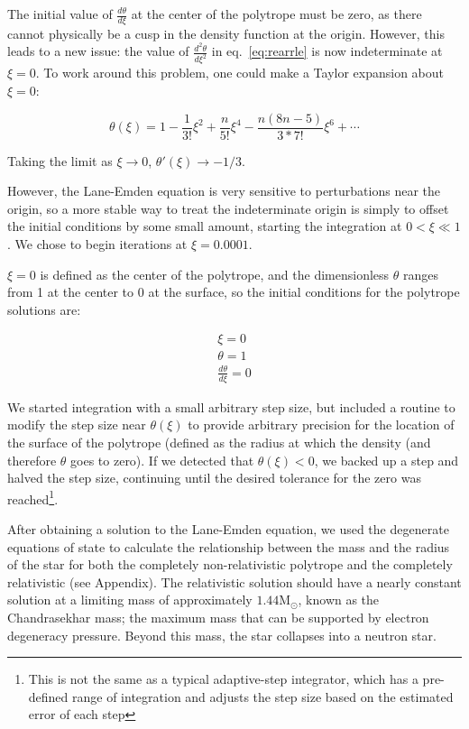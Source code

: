 \documentclass[twoside]{article}
\begin{document}
\begin{multicols}{2}
The initial value of \(\frac{d\theta}{d\xi}\) at the center of the polytrope
must be zero, as there cannot physically be a cusp in the density function at
the origin. However, this leads to a new issue: the value of
\(\frac{d^2\theta}{d\xi^2}\) in eq.~\ref{eq:rearrle} is now indeterminate at
\(\xi=0\). To work around this problem, one could make a Taylor expansion about
\(\xi=0\)\cite[p.339]{hansen2004}:

\begin{equation}
    \theta(\xi)=1-\frac{1}{3!}\xi^2+\frac{n}{5!}\xi^4-\frac{n(8n-5)}{3*7!}\xi^6+\dotsb
\end{equation}

Taking the limit as \(\xi\rightarrow 0\), \(\theta'(\xi)\rightarrow -1/3\).

However, the Lane-Emden equation is very sensitive to perturbations near the
origin\cite[p.340]{hansen2004}, so a more stable way to treat the indeterminate
origin is simply to offset the initial conditions by some small amount, starting
the integration at \(0 < \xi \ll 1\). We chose to begin iterations at
\(\xi=0.0001\).

\(\xi=0\) is defined as the center of the polytrope, and the dimensionless
\(\theta\) ranges from 1 at the center to 0 at the surface, so the initial
conditions for the polytrope solutions are:

\[
    \begin{array}{l}
        \xi = 0 \\
        \theta = 1 \\
        \frac{d\theta}{d\xi} = 0
    \end{array}
\]

We started integration with a small arbitrary step size, but included a routine
to modify the step size near \(\theta(\xi)\) to provide arbitrary precision for
the location of the surface of the polytrope (defined as the radius at which the
density (and therefore \(\theta\) goes to zero). If we detected that
\(\theta(\xi) < 0\), we backed up a step and halved the step size, continuing
until the desired tolerance for the zero was reached\footnote{This is not the
same as a typical adaptive-step integrator, which has a pre-defined range of
integration and adjusts the step size based on the estimated error of each
step}.

After obtaining a solution to the Lane-Emden equation, we used the degenerate
equations of state to calculate the relationship between the mass and the
radius of the star for both the completely non-relativistic polytrope and the
completely relativistic (see Appendix). The relativistic solution should have a
nearly constant solution at a limiting mass of approximately
\(1.44\mathrm{M}_{\odot}\), known as the Chandrasekhar mass; the maximum mass
that can be supported by electron degeneracy pressure. Beyond this mass, the
star collapses into a neutron star.


\end{multicols}
\end{document}
